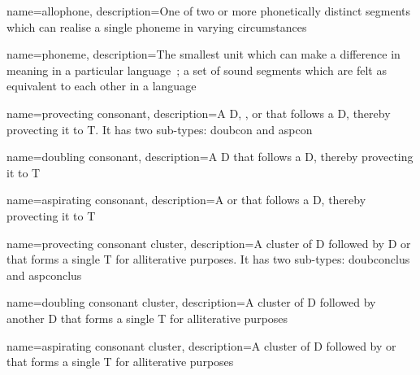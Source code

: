 \usepackage[%
            xindy,
            toc,
            ]{glossaries}
\usepackage{glossary-mcols}

\makeglossaries
\usepackage[xindy]{imakeidx}
\makeindex


%
{
  name=allophone,
  description={One of two or more phonetically distinct segments which can realise a single phoneme in varying circumstances~\autocite[s.v.~\emph{allophone}]{Tra_dictionary96}}
}

%
{
  name=phoneme,
  description={The smallest unit which can make a difference in meaning in a particular language~\autocite[s.v.~\emph{phoneme}]{Tra_dictionary96}; a set of sound segments which are felt as equivalent to each other in a language}
}

{
    name=provecting consonant,
    description={A \gls{D}, , or  that follows a \gls{D}, thereby provecting it to \gls{T}. It has two sub-types: \gls{doubcon} and \gls{aspcon}}
}

{
    name=doubling consonant,
    description={A \gls{D} that follows a \gls{D}, thereby provecting it to \gls{T}}
}

{
    name=aspirating consonant,
    description={A  or  that follows a \gls{D}, thereby provecting it to \gls{T}}
}

{
    name=provecting consonant cluster,
    description={A cluster of \gls{D} followed by \gls{D} or  that forms a single \gls{T} for alliterative purposes. It has two sub-types: \gls{doubconclus} and \gls{aspconclus}}
}

{
    name=doubling consonant cluster,
    description={A cluster of \gls{D} followed by another \gls{D} that forms a single \gls{T} for alliterative purposes}
}

{
    name=aspirating consonant cluster,
    description={A cluster of \gls{D} followed by  or  that forms a single \gls{T} for alliterative purposes}
}

